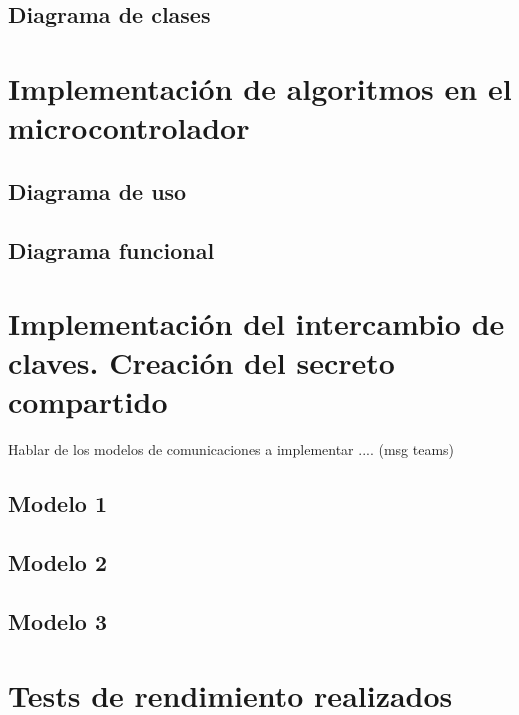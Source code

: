 \subsection{Diagrama de clases}
\section{Implementación de algoritmos en el microcontrolador}
\subsection{Diagrama de uso}
\subsection{Diagrama funcional}

\section{Implementación del intercambio de claves. Creación del secreto compartido}
Hablar de los modelos de comunicaciones a implementar .... (msg teams)
\subsection{Modelo 1}
\subsection{Modelo 2}
\subsection{Modelo 3}
\section{Tests de rendimiento realizados}